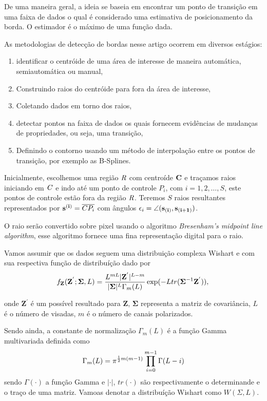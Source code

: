 \documentclass[12pt,a4paper]{article}
\begin{document}
De uma maneira geral, a ideia se baseia em encontrar um ponto de transição em uma faixa de dados o qual é considerado uma estimativa de posicionamento da borda. O estimador é o máximo de uma função dada. 

As metodologias de detecção de bordas nesse artigo ocorrem em diversos estágios:

\begin{enumerate}
	\item identificar o centróide de uma área de interesse de maneira automática, semiautomática ou manual,  
	\item Construindo raios do centróide para fora da área de interesse,
	\item Coletando dados em torno dos raios,
	\item detectar pontos na faixa de dados os quais fornecem evidências de mudanças de propriedades, ou seja, uma transição,
	\item Definindo o contorno usando um método de interpolação entre os pontos de transição, por exemplo as B-Splines.
\end{enumerate}

Inicialmente, escolhemos uma região $\it R$ com centroíde $\bf C$ e traçamos raios iniciando em $\it C$ e indo até um ponto de controle $P_i$, com $i=1,2,\dots, S$, este pontos de controle estão fora da região $\it R$. Teremos $S$ raios resultantes representados por ${\bf s^{(i)}}=\overline{CP_i}$ com ângulos $\epsilon_{i}=\angle ({\bf s_{(i)}},{\bf s_{(i+1)}})$. 

O raio serão convertido sobre pixel usando o algoritmo {\it Bresenham's midpoint line algorithm}, esse algoritmo fornece uma fina representação digital para o raio.

Vamos assumir que os dados seguem uma distribuição complexa Wishart e com sua respectiva função de distribuíção dado por 
\begin{equation}\label{eqn120}
	f_{\mathbf{Z}}(\mathbf{Z^{'}};\mathbf{\Sigma},L)=\frac{L^{mL}|\mathbf{Z^{'}}|^{L-m}}{|\mathbf{\Sigma}|^{L}\Gamma_m(L)} \exp(-L tr(\mathbf{\Sigma}^{-1}\mathbf{Z^{'}})), \\
\end{equation}

onde $\mathbf{Z^{'}}$ é um possível resultado para $\mathbf{Z}$, $\mathbf{\Sigma}$ representa a matriz de covariância, $L$ é o número de visadas, $m$ é o número de canais polarizados.

Sendo ainda, a constante de normalização $\Gamma_m(L)$ é a função Gamma multivariada definida como 
\begin{equation}\label{eqn121}
	\Gamma_m(L)=\pi^{\frac{1}{2}m(m-1)} \prod_{i=0}^{m-1}\Gamma(L-i) \\
\end{equation}
sendo $\Gamma(\cdot)$ a função Gamma e $|\cdot|$, $tr(\cdot)$ são respectivamente o determinande e o traço de uma matriz. Vamoas denotar a distribuíção Wishart como $W(\Sigma,L)$. 
\end{document}
